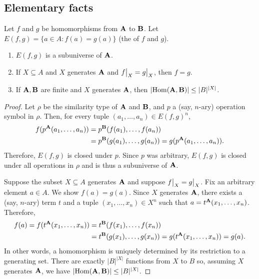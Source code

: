 \subsection{Elementary facts}
\begin{lemma}
  \label{ex:1.16.6} 
  Let $f$ and $g$ be homomorphisms from $\mathbf{A}$ to $\mathbf{B}$.
  Let $E(f,g) = \{ a \in A : f(a) = g(a) \}$ (the  of $f$ and $g$). 
  \begin{enumerate}
    \item	$E(f,g)$ is a subuniverse of $\mathbf{A}$.
    \item If $X \subseteq A$ and $X$ generates $\mathbf{A}$ and
    $\restr{f}{X} = \restr{g}{X}$, then $f = g$. 
    \item If $\mathbf{A}, \mathbf{B}$ are finite and $X$ generates $\mathbf{A}$, 
    then $|\!\operatorname{Hom}(\mathbf{A},\mathbf{B})| \leq |B|^{|X|}$.
  \end{enumerate}
\end{lemma}
\begin{proof}
  Let $\rho$ be the similarity type of $\mathbf{A}$ and $\mathbf{B}$, and 
  $p$ a (say, $n$-ary) operation symbol in $\rho$. Then, 
  for every tuple $(a_1, \dots, a_n) \in E(f,g)^n$,
  \begin{align*}
    f(p^{\mathbf{A}}(a_1, \dots, a_n)) &= p^{\mathbf{B}}(f(a_1), \dots, f(a_n))\\
                                    &= p^{\mathbf{B}}(g(a_1), \dots, g(a_n))
                                     = g(p^{\mathbf{A}}(a_1, \dots, a_n)).
  \end{align*}
  Therefore, $E(f,g)$ is closed under $p$.  Since $p$ was arbitrary, 
  $E(f,g)$ is closed under all operations in $\rho$ and is thus a 
  subuniverse of $\mathbf{A}$.

  Suppose the subset $X \subseteq A$ generates $\mathbf{A}$ and suppose
  $\restr{f}{X} = \restr{g}{X}$.
  Fix an arbitrary element $a\in A$.  We show $f(a) = g(a)$.
  Since $X$ generates $\mathbf{A}$, there exists a (say, $n$-ary) term $t$ and 
  a tuple $(x_1, \dots, x_n) \in X^n$ such that 
  $a = t^{\mathbf{A}}(x_1, \dots, x_n)$. Therefore, 
  \begin{align*}
    f(a) = f(t^{\mathbf{A}}(x_1, \dots, x_n)) &= t^{\mathbf{B}}(f(x_1), \dots, f(x_n))\\
                                    &= t^{\mathbf{B}}(g(x_1), \dots, g(x_n))
                                     = g(t^{\mathbf{A}}(x_1, \dots, x_n)) = g(a).
  \end{align*}
  In other words, a homomorphism is uniquely determined by its restriction to 
  a generating set. There are exactly $|B|^{|X|}$ functions from $X$ to $B$ so, 
  assuming $X$ generates $\mathbf{A}$, we have
  $|\!\operatorname{Hom}(\mathbf{A},\mathbf{B})| \leq |B|^{|X|}$.
\end{proof}

